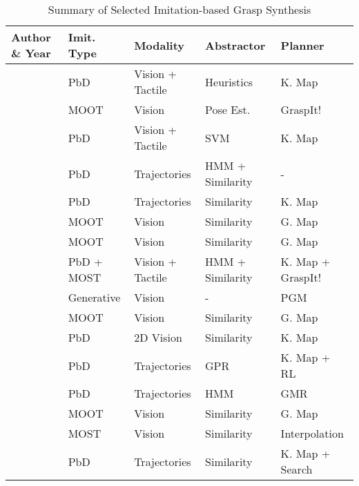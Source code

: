 \documentclass[letterpaper,10pt]{article}
\begin{document}
\begin{table}[t]
\caption{Summary of Selected Imitation-based Grasp Synthesis}
\label{table:imitation-grasp}
\begin{center}
\begin{tabularx}{1\columnwidth}{m{5cm}m{1.8cm}<{\centering}m{2.4cm}<{\centering}m{2.2cm}<{\centering}m{2.6cm}<{\centering}}
\toprule
 \bf Author \& \bf Year & \bf Imit. Type & \bf Modality & \bf Abstractor & \bf Planner \\
\midrule

\cite{kang1993toward} & PbD & Vision + Tactile & Heuristics & K. Map \\
\cite{kragic2001real} & MOOT & Vision & Pose Est. & GraspIt!\\
\cite{zollner2001dynamic} & PbD & Vision + Tactile & SVM & K. Map\\
\cite{ekvall2005grasp} & PbD & Trajectories & HMM + Similarity & -\\
\cite{aleotti2006grasp} & PbD & Trajectories & Similarity & K. Map \\
\cite{hsiao2006imitation} & MOOT & Vision & Similarity & G. Map\\
\cite{morales2006anthropomorphic}  & MOOT & Vision & Similarity & G. Map\\
\cite{ekvall2007learning} & PbD + MOST & Vision + Tactile & HMM + Similarity & K. Map + GraspIt! \\
\cite{sweeney2007model} & Generative & Vision & - & PGM \\
\cite{curtis2008efficient} & MOOT & Vision & Similarity & G. Map \\
\cite{do2009grasp} & PbD & 2D Vision & Similarity & K. Map\\
\cite{grave2010improving} & PbD & Trajectories & GPR & K. Map + RL\\
\cite{schmidts2011imitation} & PbD & Trajectories & HMM & GMR \\
\cite{herzog2012template} & MOOT & Vision & Similarity & G. Map\\
\cite{pokorny2013grasp} & MOST & Vision & Similarity & Interpolation\\
\cite{lin2014grasp} & PbD & Trajectories & Similarity & K. Map + Search \\

\bottomrule
\end{tabularx}
\end{center}
\vspace{-15pt}
\end{table}
\end{document}
